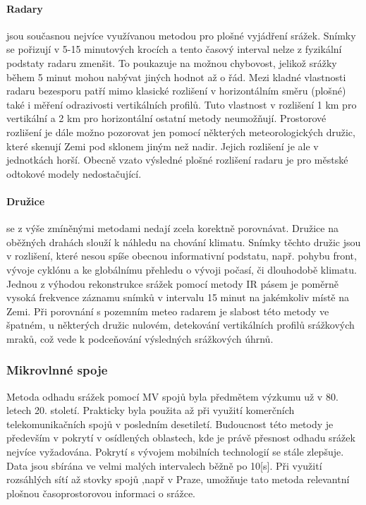 \documentclass[a4paper,12pt]{article}
\begin{document}
\paragraph*{Radary}
jsou současnou nejvíce využívanou metodou pro plošné vyjádření srážek. Snímky se pořizují v 5-15 minutových krocích a tento časový interval nelze z fyzikální podstaty radaru zmenšit. To poukazuje na možnou chybovost, jelikož srážky během 5 minut mohou nabývat jiných hodnot až o řád. Mezi kladné vlastnosti radaru bezesporu patří mimo klasické rozlišení v horizontálním směru (plošné) také i měření odrazivosti vertikálních profilů. Tuto vlastnost v rozlišení 1 km pro vertikální a 2 km pro horizontální ostatní metody neumožňují. Prostorové rozlišení je dále možno pozorovat jen pomocí některých meteorologických družic, které skenují Zemi pod sklonem jiným než nadir. Jejich rozlišení je ale v jednotkách horší. Obecně vzato výsledné plošné rozlišení radaru je pro městské odtokové modely nedostačující.  

\paragraph*{Družice} se z výše zmíněnými metodami nedají zcela korektně porovnávat. Družice na oběžných drahách slouží k náhledu na chování klimatu. Snímky těchto družic jsou v rozlišení, které nesou spíše obecnou informativní podstatu, např. pohybu front, vývoje cyklónu a ke globálnímu přehledu o vývoji počasí, či dlouhodobě klimatu.
Jednou z výhodou rekonstrukce srážek pomocí metody \acs{IR} pásem je poměrně vysoká frekvence záznamu snímků v intervalu 15 minut na jakémkoliv místě na Zemi. Při porovnání s pozemním meteo radarem je slabost této metody ve špatném, u některých družic nulovém, detekování vertikálních profilů srážkových mraků, což vede k podceňování výsledných srážkových úhrnů.


\subsubsection{Mikrovlnné spoje}
Metoda odhadu srážek pomocí MV spojů byla předmětem výzkumu už v 80. letech 20. století. Prakticky byla použita až při využití komerčních telekomunikačních spojů v posledním desetiletí. Budoucnost této metody je především v pokrytí v osídlených oblastech, kde je právě přesnost odhadu srážek nejvíce vyžadována. Pokrytí s vývojem mobilních technologií se stále zlepšuje. Data jsou sbírána ve velmi malých intervalech běžně po 10[s]. Při využití rozsáhlých sítí až stovky spojů ,např v Praze, umožňuje tato metoda relevantní plošnou časoprostorovou informaci o srážce.
 
\end{document}
